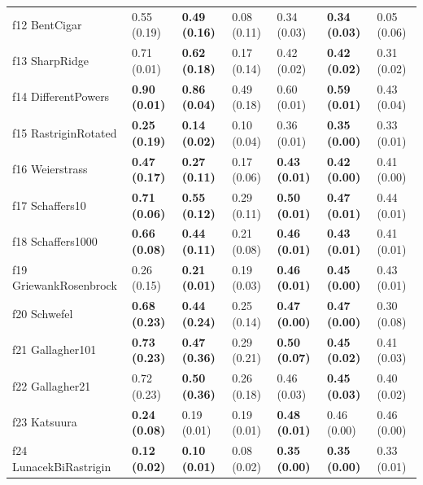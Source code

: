 \begin{table}
\begin{tabular}{lllllll}
f12 BentCigar & 0.55 (0.19) & \textbf{0.49 (0.16)} & 0.08 (0.11) & 0.34 (0.03) & \textbf{0.34 (0.03)} & 0.05 (0.06) \\
f13 SharpRidge & 0.71 (0.01) & \textbf{0.62 (0.18)} & 0.17 (0.14) & 0.42 (0.02) & \textbf{0.42 (0.02)} & 0.31 (0.02) \\
f14 DifferentPowers & \textbf{0.90 (0.01)} & \textbf{0.86 (0.04)} & 0.49 (0.18) & 0.60 (0.01) & \textbf{0.59 (0.01)} & 0.43 (0.04) \\
f15 RastriginRotated & \textbf{0.25 (0.19)} & \textbf{0.14 (0.02)} & 0.10 (0.04) & 0.36 (0.01) & \textbf{0.35 (0.00)} & 0.33 (0.01) \\
f16 Weierstrass & \textbf{0.47 (0.17)} & \textbf{0.27 (0.11)} & 0.17 (0.06) & \textbf{0.43 (0.01)} & \textbf{0.42 (0.00)} & 0.41 (0.00) \\
f17 Schaffers10 & \textbf{0.71 (0.06)} & \textbf{0.55 (0.12)} & 0.29 (0.11) & \textbf{0.50 (0.01)} & \textbf{0.47 (0.01)} & 0.44 (0.01) \\
f18 Schaffers1000 & \textbf{0.66 (0.08)} & \textbf{0.44 (0.11)} & 0.21 (0.08) & \textbf{0.46 (0.01)} & \textbf{0.43 (0.01)} & 0.41 (0.01) \\
f19 GriewankRosenbrock & 0.26 (0.15) & \textbf{0.21 (0.01)} & 0.19 (0.03) & \textbf{0.46 (0.01)} & \textbf{0.45 (0.00)} & 0.43 (0.01) \\
f20 Schwefel & \textbf{0.68 (0.23)} & \textbf{0.44 (0.24)} & 0.25 (0.14) & \textbf{0.47 (0.00)} & \textbf{0.47 (0.00)} & 0.30 (0.08) \\
f21 Gallagher101 & \textbf{0.73 (0.23)} & \textbf{0.47 (0.36)} & 0.29 (0.21) & \textbf{0.50 (0.07)} & \textbf{0.45 (0.02)} & 0.41 (0.03) \\
f22 Gallagher21 & 0.72 (0.23) & \textbf{0.50 (0.36)} & 0.26 (0.18) & 0.46 (0.03) & \textbf{0.45 (0.03)} & 0.40 (0.02) \\
f23 Katsuura & \textbf{0.24 (0.08)} & 0.19 (0.01) & 0.19 (0.01) & \textbf{0.48 (0.01)} & 0.46 (0.00) & 0.46 (0.00) \\
f24 LunacekBiRastrigin & \textbf{0.12 (0.02)} & \textbf{0.10 (0.01)} & 0.08 (0.02) & \textbf{0.35 (0.00)} & \textbf{0.35 (0.00)} & 0.33 (0.01) \\
\bottomrule
\end{tabular}
\end{table}
